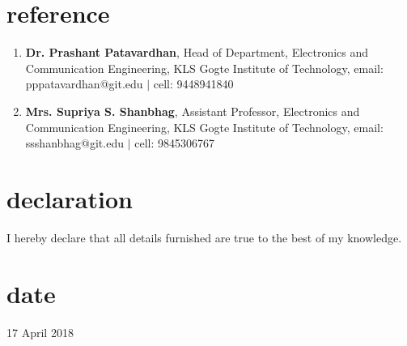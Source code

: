 \documentclass[10pt]{article}
\begin{document}
	\section*{reference}
	\begin{enumerate}
		\item \textbf{Dr. Prashant Patavardhan}, 
			Head of Department, Electronics and Communication 	Engineering, 
KLS Gogte Institute of Technology, 
email: pppatavardhan@git.edu $|$ cell: 9448941840
		\item\textbf{Mrs. Supriya S. Shanbhag}, Assistant Professor,  Electronics and Communication Engineering, 
KLS Gogte Institute of Technology, 
email: ssshanbhag@git.edu $|$ cell: 9845306767
	\end{enumerate}
	
	\section*{declaration}
	I hereby declare that all details furnished are true to the best of my knowledge.

	\section*{date}
	17 April 2018
\end{document}
